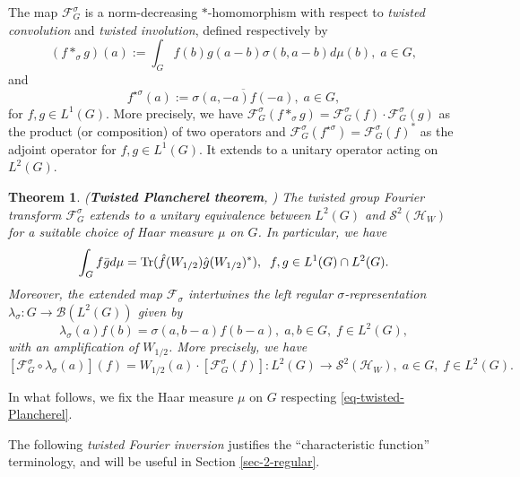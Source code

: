 \documentclass[12pt,reqno]{amsart}
\newtheorem{thm}{Theorem}
\theoremstyle{definition}
\theoremstyle{definition}
\theoremstyle{definition}
\numberwithin{thm}{section}
\numberwithin{equation}{section}
\newcommand{\F}{\mathcal{F}}
\newcommand{\Hi}{\mathcal{H}}
\newcommand{\mc}[1]{\mathcal #1}
\begin{document}
The map $\F^\sigma_G$ is a norm-decreasing $*$-homomorphism with respect to {\em twisted convolution} and {\em twisted involution}, defined respectively by
    $$(f *_\sigma g)(a) := \int_G f(b) g(a-b) \sigma(b,a-b) d\mu(b),\; a\in G,$$
and
    $$f^{\star\sigma}(a) := \overline{\sigma(a,-a) f(-a)},\; a\in G,$$
for $f,g \in L^1(G)$. More precisely, we have $\F^\sigma_G(f *_\sigma g) = \F^\sigma_G(f)\cdot \F^\sigma_G(g)$ as the product (or composition) of two operators and $\F^\sigma_G(f^{\star\sigma}) = \F^\sigma_G(f)^*$ as the adjoint operator for $f,g \in L^1(G)$. It extends to a unitary operator acting on $L^2(G)$.

\begin{thm}\label{thm-twistedPlancherel} ({\bf Twisted Plancherel theorem}, \cite[Theorem 7.1]{KleppnerLipsman72})
The twisted group Fourier transform $\mc F^\sigma_G$ extends to a unitary equivalence between $L^2(G)$ and $\mc S^2(\Hi_W)$ for a suitable choice of Haar measure $\mu$ on $G$. In particular, we have
    \begin{equation}\label{eq-twisted-Plancherel}
        \int_G f\bar{g} d\mu = {\rm Tr}(\hat{f}(W_{1/2}) \hat{g}(W_{1/2})^*), \;\; f,g\in L^1(G)\cap L^2(G).
    \end{equation}
Moreover, the extended map $\mc{F}_\sigma$ intertwines the {\em left regular $\sigma$-representation} $\lambda_\sigma: G \to \mc B(L^2(G))$ given by
    \begin{equation*}\label{eq-reg-rep}
        \lambda_\sigma(a)f(b) = \sigma(a,b-a)f(b-a),\; a,b\in G,\; f\in L^2(G),
    \end{equation*}
with an amplification of $W_{1/2}$. More precisely, we have
\begin{equation}\label{eq-intertwining}
[\F^\sigma_G \circ \lambda_\sigma(a)](f) = W_{1/2}(a)\cdot [\F^\sigma_G(f)]:L^2(G)\rightarrow \mc S^2(\mathcal{H}_W),\; a\in G,\; f\in L^2(G).
\end{equation}
\end{thm}

In what follows, we fix the Haar measure $\mu$ on $G$ respecting \eqref{eq-twisted-Plancherel}.

The following \textit{twisted Fourier inversion} justifies the ``characteristic function''  terminology, and will be useful in Section \ref{sec-2-regular}.
\end{document}
